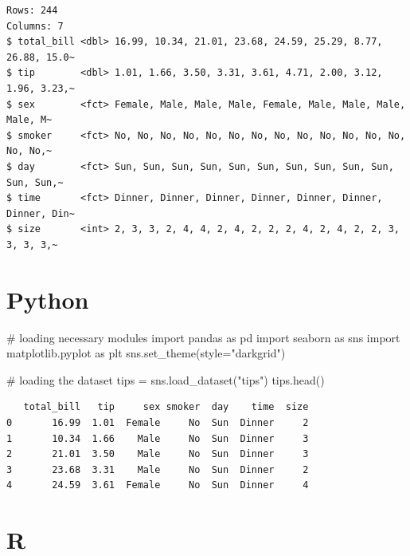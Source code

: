 \documentclass[
  letterpaper,
  DIV=11,
  numbers=noendperiod]{scrreprt}
\newenvironment{Shaded}{\begin{snugshade}}{\end{snugshade}}
\newcommand{\CommentTok}[1]{\textcolor[rgb]{0.37,0.37,0.37}{#1}}
\newcommand{\ImportTok}[1]{\textcolor[rgb]{0.00,0.46,0.62}{#1}}
\newcommand{\NormalTok}[1]{\textcolor[rgb]{0.00,0.23,0.31}{#1}}
\newcommand{\OperatorTok}[1]{\textcolor[rgb]{0.37,0.37,0.37}{#1}}
\newcommand{\StringTok}[1]{\textcolor[rgb]{0.13,0.47,0.30}{#1}}
\begin{document}
\begin{verbatim}
Rows: 244
Columns: 7
$ total_bill <dbl> 16.99, 10.34, 21.01, 23.68, 24.59, 25.29, 8.77, 26.88, 15.0~
$ tip        <dbl> 1.01, 1.66, 3.50, 3.31, 3.61, 4.71, 2.00, 3.12, 1.96, 3.23,~
$ sex        <fct> Female, Male, Male, Male, Female, Male, Male, Male, Male, M~
$ smoker     <fct> No, No, No, No, No, No, No, No, No, No, No, No, No, No, No,~
$ day        <fct> Sun, Sun, Sun, Sun, Sun, Sun, Sun, Sun, Sun, Sun, Sun, Sun,~
$ time       <fct> Dinner, Dinner, Dinner, Dinner, Dinner, Dinner, Dinner, Din~
$ size       <int> 2, 3, 3, 2, 4, 4, 2, 4, 2, 2, 2, 4, 2, 4, 2, 2, 3, 3, 3, 3,~
\end{verbatim}

\section{Python}

\begin{Shaded}
\begin{Highlighting}[]
\CommentTok{\# loading necessary modules }
\ImportTok{import}\NormalTok{ pandas }\ImportTok{as}\NormalTok{ pd}
\ImportTok{import}\NormalTok{ seaborn }\ImportTok{as}\NormalTok{ sns}
\ImportTok{import}\NormalTok{ matplotlib.pyplot }\ImportTok{as}\NormalTok{ plt }
\NormalTok{sns.set\_theme(style}\OperatorTok{=}\StringTok{"darkgrid"}\NormalTok{)}
\end{Highlighting}
\end{Shaded}

\begin{Shaded}
\begin{Highlighting}[]
\CommentTok{\# loading the dataset }
\NormalTok{tips }\OperatorTok{=}\NormalTok{ sns.load\_dataset(}\StringTok{"tips"}\NormalTok{)}
\NormalTok{tips.head()}
\end{Highlighting}
\end{Shaded}

\begin{verbatim}
   total_bill   tip     sex smoker  day    time  size
0       16.99  1.01  Female     No  Sun  Dinner     2
1       10.34  1.66    Male     No  Sun  Dinner     3
2       21.01  3.50    Male     No  Sun  Dinner     3
3       23.68  3.31    Male     No  Sun  Dinner     2
4       24.59  3.61  Female     No  Sun  Dinner     4
\end{verbatim}

\section{R}
\end{document}
